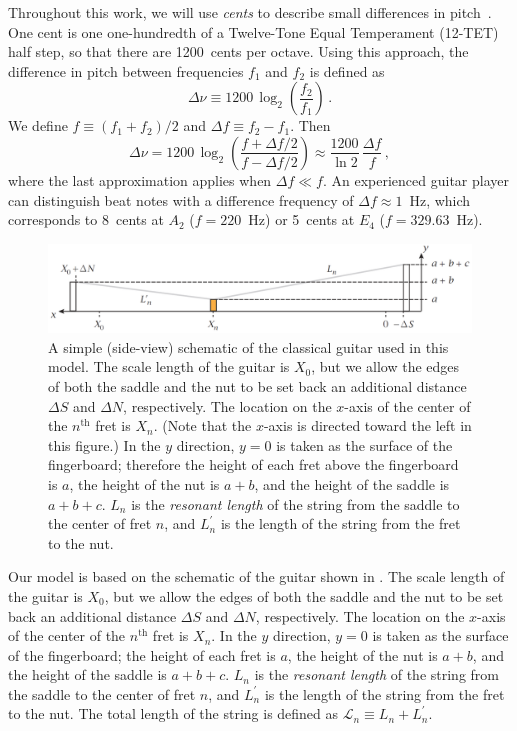 Throughout this work, we will use \emph{cents} to describe small differences in pitch~\cite{ref:durfee2015pms}. One cent is one one-hundredth of a Twelve-Tone Equal Temperament (12-TET) half step, so that there are 1200~cents per octave. Using this approach, the difference in pitch between frequencies $f_1$ and $f_2$ is defined as
 \begin{equation} \label{eqn:cents_def}
\Delta \nu \equiv 1200\, \log_2\left(\frac{f_2}{f_1}\right)\, .
 \end{equation}
We define $f \equiv (f_1 + f_2) / 2$ and $\Delta f \equiv f_2 - f_1$. Then
 \begin{equation} \label{eqn:cents_approx}
\Delta \nu = 1200\, \log_2\left(\frac{f + \Delta f / 2}{f - \Delta f /2}\right) \approx \frac{1200}{\ln 2}\, \frac{\Delta f}{f}\, ,
 \end{equation}
where the last approximation applies when $\Delta f \ll f$. An experienced guitar player can distinguish beat notes with a difference frequency of $\Delta f \approx 1$~Hz, which corresponds to 8~cents at $A_2$ ($f = 220$~Hz) or 5~cents at $E_4$ ($f = 329.63$~Hz).

 \begin{figure}
  \centering
  \includegraphics[width=6.0in]{figures/guitar_schematic}
  \caption{\label{fig:guitar_schematic} A simple (side-view) schematic of the classical guitar used in this model. The scale length of the guitar is $X_0$, but we allow the edges of both the saddle and the nut to be set back an additional distance $\Delta S$ and $\Delta N$, respectively. The location on the $x$-axis of the center of the $n^\textrm{th}$ fret is $X_n$. (Note that the $x$-axis is directed toward the left in this figure.) In the $y$ direction, $y = 0$ is taken as the surface of the fingerboard; therefore the height of each fret above the fingerboard is $a$, the height of the nut is $a + b$, and the height of the saddle is $a + b + c$. $L_n$ is the \emph{resonant length} of the string from the saddle to the center of fret $n$, and $L^\prime_n$ is the length of the string from the fret to the nut.}
 \end{figure}

Our model is based on the schematic of the guitar shown in . The scale length of the guitar is $X_0$, but we allow the edges of both the saddle and the nut to be set back an additional distance $\Delta S$ and $\Delta N$, respectively. The location on the $x$-axis of the center of the $n^\textrm{th}$ fret is $X_n$. In the $y$ direction, $y = 0$ is taken as the surface of the fingerboard; the height of each fret is $a$, the height of the nut is $a + b$, and the height of the saddle is $a + b + c$. $L_n$ is the \emph{resonant length} of the string from the saddle to the center of fret $n$, and $L^\prime_n$ is the length of the string from the fret to the nut. The total length of the string is defined as $\mathcal{L}_n \equiv L_n + L^\prime_n$.

